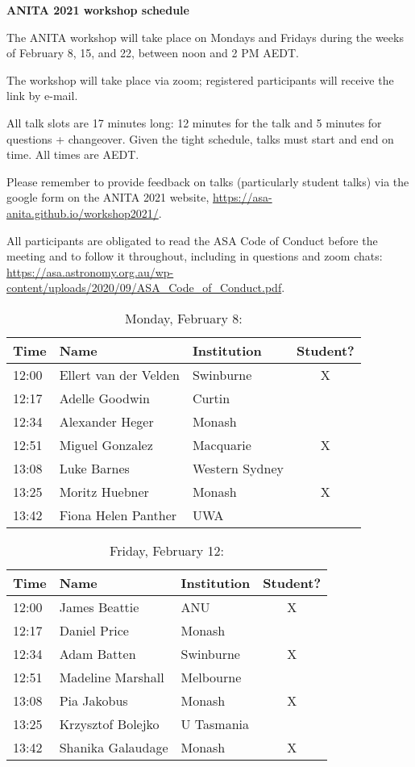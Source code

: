 \documentclass[amsmath,onecolumn]{revtex4-1}
\begin{document}
\begin{center}
{\bf ANITA 2021 workshop schedule}\\
\end{center}
\vspace{0.2in}

The ANITA workshop will take place on Mondays and Fridays during the weeks of February 8, 15, and 22, between noon and 2 PM AEDT.

The workshop will take place via zoom; registered participants will receive the link by e-mail.  

All talk slots are 17 minutes long: 12 minutes for the talk and 5 minutes for questions + changeover.  Given the tight schedule, talks must start and end on time.  All times are AEDT.

Please remember to provide feedback on talks (particularly student talks) via the google form on the ANITA 2021 website, \url{https://asa-anita.github.io/workshop2021/}.

All participants are obligated to read the ASA Code of Conduct before the meeting and to follow it throughout, including in questions and zoom chats:
\url{https://asa.astronomy.org.au/wp-content/uploads/2020/09/ASA_Code_of_Conduct.pdf}.

\FloatBarrier

\begin{table}[!htbp]
	\centering
	\caption{Monday, February 8:}
\begin{tabular}{| l | l | l | c |}
	\hline
	Time & Name  & Institution & Student? \\ 		
	\hline
	12:00 & Ellert van der Velden & Swinburne & X \\
	12:17 & Adelle Goodwin & Curtin & \\
	12:34 & Alexander	Heger & Monash & \\
	12:51 & 	Miguel	Gonzalez & Macquarie & X\\
	13:08 & Luke	Barnes & Western Sydney & \\
	13:25 & Moritz	Huebner & Monash & X \\
	13:42 &  Fiona Helen	Panther  & UWA &  \\
	\hline
\end{tabular}
\end{table}

\begin{table}[!htbp]
	\centering
	\caption{Friday, February 12:}
\begin{tabular}{| l | l | l | c |}
	\hline
	Time & Name  & Institution & Student? \\ 		
	\hline
	12:00 & James	Beattie & ANU  & X \\
	12:17 & Daniel Price & Monash & \\
	12:34 & Adam	Batten & Swinburne & X \\
	12:51 & Madeline	Marshall &  Melbourne & \\
	13:08 & Pia	Jakobus & Monash & X \\
	13:25 & Krzysztof 	Bolejko & U Tasmania  &	\\
	13:42 & Shanika	Galaudage & Monash & X\\
	\hline
\end{tabular}
\end{table}
\end{document}
